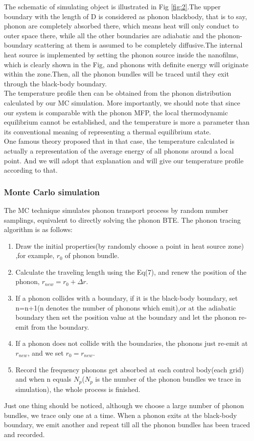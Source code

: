 The schematic of simulating object is illustrated in Fig \ref{fig:2}.The upper boundary with the length of D is considered as phonon blackbody, that is to say, phonon are completely absorbed there, which means heat will only conduct to outer space there, while all the other boundaries are adiabatic and the phonon-boundary scattering at them is assumed to be completely diffusive.The internal heat source is implemented by setting the phonon source inside the nanofilms, which is clearly shown in the Fig, and phonons with definite energy will originate within the zone.Then, all the phonon bundles will be traced until they exit through the black-body boundary. \\
\indent The temperature profile then can be obtained from the phonon distribution calculated by our MC simulation\cite{hua1}. More importantly, we should note that since our system is comparable with the phonon MFP, the local thermodynamic equilibrium cannot be established, and the temperature is more a parameter than its conventional meaning of representing a thermal equilibrium state.\\
\indent One famous theory proposed that in that case, the temperature calculated is actually a representation of the average energy of all phonons around a local point\cite{Super}. And we will adopt that explanation and will give our temperature profile according to that.
\subsubsection{Monte Carlo simulation}
The MC technique simulates phonon transport process by random number samplings, equivalent to directly solving the phonon BTE. The phonon tracing algorithm is as follows:
\begin{enumerate}
\item Draw the initial properties(by randomly choose a point in heat source zone) ,for example, $r_0$ of phonon bundle.
\item Calculate the traveling length using the Eq(7), and renew the position of the phonon, $r_{new}=r_0+\Delta r$.
\item If a phonon collides with a boundary, if it is the black-body boundary, set n=n+1(n denotes the number of phonons which emit),or at the adiabatic boundary then
 set the position value at the boundary and let the phonon re-emit from the boundary.
 \item If a phonon does not collide with the boundaries, the phonons just re-emit at $r_{new}$, and we set $r_0=r_{new}$.
 \item Record the frequency phonons get absorbed at each control body(each grid) and when n equals $N_p$($N_p$ is the number of the phonon bundles we trace in simulation), the whole process is finished.
\end{enumerate}
Just one thing should be noticed, although we choose a large number of phonon bundles, we trace only one at a time. When a phonon exits at the black-body boundary, we emit another and repeat till all the phonon bundles has been traced and recorded.

